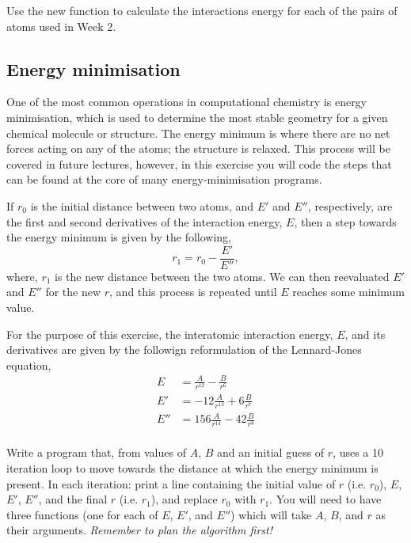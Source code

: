 \documentclass[a4paper]{article}
\begin{document}
Use the new function to calculate the interactions energy for each of the pairs of atoms used in Week 2.

\subsection{Energy minimisation}

One of the most common operations in computational chemistry is energy minimisation, which is used to determine the most stable geometry for a given chemical molecule or structure.
The energy minimum is where there are no net forces acting on any of the atoms; the structure is relaxed.
This process will be covered in future lectures, however, in this exercise you will code the steps that can be found at the core of many energy-minimisation programs.

If $r_0$ is the initial distance between two atoms, and $E'$ and $E''$, respectively, are the first and second derivatives of the interaction energy, $E$, then a step towards the energy minimum is given by the following,
\begin{equation}
  r_1 = r_0 - \frac{E'}{E''},
\end{equation}
where, $r_1$ is the new distance between the two atoms.
We can then reevaluated $E'$ and $E''$ for the new $r$, and this process is repeated until $E$ reaches some minimum value.

For the purpose of this exercise, the interatomic interaction energy, $E$, and its derivatives are given by the followign reformulation of the Lennard-Jones equation,
\begin{equation}
  \begin{aligned}
    E & = \frac{A}{r^{12}} - \frac{B}{r^6} \\
    E' & = -12\frac{A}{r^{13}} + 6\frac{B}{r^7} \\
    E'' & = 156\frac{A}{r^{14}} - 42\frac{B}{r^8} \\
  \end{aligned}
\end{equation}

Write a program that, from values of $A$, $B$ and an initial guess of $r$, uses a 10 iteration loop to move towards the distance at which the energy minimum is present.
In each iteration: print a line containing the initial value of $r$ (i.e. $r_0$), $E$, $E'$, $E''$, and the final $r$ (i.e. $r_1$), and replace $r_0$ with $r_1$.
You will need to have three functions (one for each of $E$, $E'$, and $E''$) which will take $A$, $B$, and $r$ as their arguments.
\emph{Remember to plan the algorithm first!}
\end{document}
